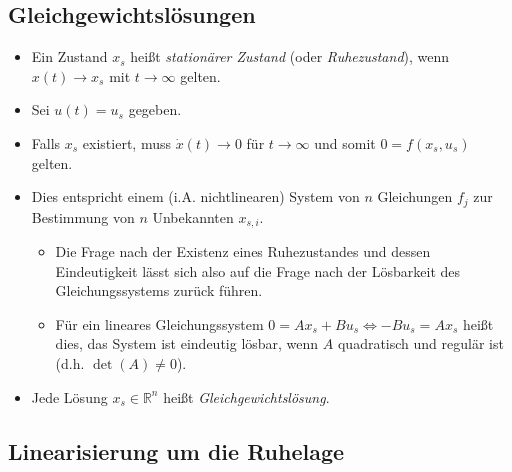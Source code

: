         \subsection{Gleichgewichtslösungen} %
            \begin{itemize}
            	\item Ein Zustand \( x _ s \) heißt \textit{stationärer Zustand} (oder \textit{Ruhezustand}), wenn \( x(t) \rightarrow x _ s \) mit \( t \rightarrow \infty \) gelten.
            	\item Sei \( u(t) = u _ s \) gegeben.
            	\item Falls \( x _ s \) existiert, muss \( \dot{x}(t) \rightarrow 0 \) für \( t \rightarrow \infty \) und somit \( 0 = f(x _ s, u _ s) \) gelten.
            	\item Dies entspricht einem (i.A. nichtlinearen) System von \(n\) Gleichungen \(f_j\) zur Bestimmung von \(n\) Unbekannten \(x_{s,i}\).
	            	\begin{itemize}
	            		\item Die Frage nach der Existenz eines Ruhezustandes und dessen Eindeutigkeit lässt sich also auf die Frage nach der Lösbarkeit des Gleichungssystems zurück führen.
	            		\item Für ein lineares Gleichungssystem \( 0 = Ax_s + Bu_s \iff -Bu_s = Ax_s \) heißt dies, das System ist eindeutig lösbar, wenn \(A\) quadratisch und regulär ist (d.h. \( \det(A) \neq 0 \)).
	            	\end{itemize}
            	\item Jede Lösung \( x _ s \in \mathbb{R} ^ n \) heißt \textit{Gleichgewichtslösung}.
            \end{itemize}

        \subsection{Linearisierung um die Ruhelage} %
            \label{sec:linearisierung}
        
